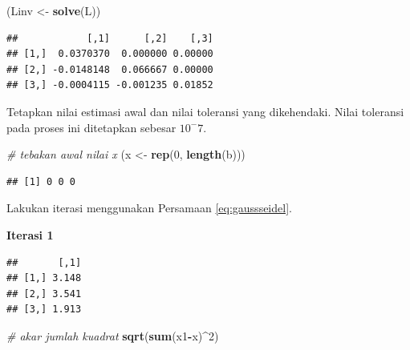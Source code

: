 \documentclass[]{book}
\newenvironment{Shaded}{\begin{snugshade}}{\end{snugshade}}
\newcommand{\CommentTok}[1]{\textcolor[rgb]{0.56,0.35,0.01}{\textit{#1}}}
\newcommand{\DecValTok}[1]{\textcolor[rgb]{0.00,0.00,0.81}{#1}}
\newcommand{\KeywordTok}[1]{\textcolor[rgb]{0.13,0.29,0.53}{\textbf{#1}}}
\newcommand{\NormalTok}[1]{#1}
\newcommand{\OperatorTok}[1]{\textcolor[rgb]{0.81,0.36,0.00}{\textbf{#1}}}
\newcommand{\StringTok}[1]{\textcolor[rgb]{0.31,0.60,0.02}{#1}}
\theoremstyle{definition}
\theoremstyle{definition}
\theoremstyle{definition}
\theoremstyle{remark}
\begin{document}
\begin{Shaded}
\begin{Highlighting}[]
\NormalTok{(Linv <-}\StringTok{ }\KeywordTok{solve}\NormalTok{(L))}
\end{Highlighting}
\end{Shaded}

\begin{verbatim}
##            [,1]      [,2]    [,3]
## [1,]  0.0370370  0.000000 0.00000
## [2,] -0.0148148  0.066667 0.00000
## [3,] -0.0004115 -0.001235 0.01852
\end{verbatim}

Tetapkan nilai estimasi awal dan nilai toleransi yang dikehendaki. Nilai toleransi pada proses ini ditetapkan sebesar \(10^-7\).

\begin{Shaded}
\begin{Highlighting}[]
\CommentTok{# tebakan awal nilai x}
\NormalTok{(x <-}\StringTok{ }\KeywordTok{rep}\NormalTok{(}\DecValTok{0}\NormalTok{, }\KeywordTok{length}\NormalTok{(b)))}
\end{Highlighting}
\end{Shaded}

\begin{verbatim}
## [1] 0 0 0
\end{verbatim}

Lakukan iterasi menggunakan Persamaan \eqref{eq:gaussseidel}.

\textbf{Iterasi 1}

\begin{Shaded}
\end{Shaded}

\begin{verbatim}
##       [,1]
## [1,] 3.148
## [2,] 3.541
## [3,] 1.913
\end{verbatim}

\begin{Shaded}
\begin{Highlighting}[]
\CommentTok{# akar jumlah kuadrat}
\KeywordTok{sqrt}\NormalTok{(}\KeywordTok{sum}\NormalTok{(x1}\OperatorTok{-}\NormalTok{x)}\OperatorTok{^}\DecValTok{2}\NormalTok{)}
\end{Highlighting}
\end{Shaded}
\end{document}
